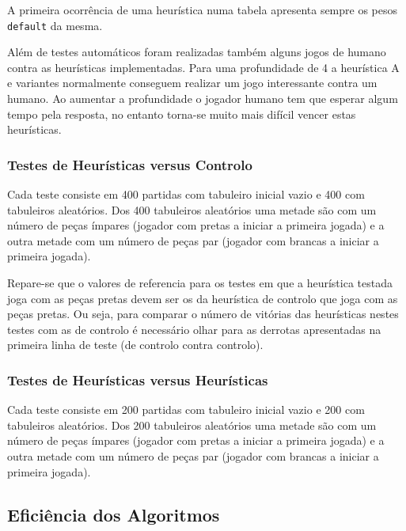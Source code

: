 A primeira ocorrência de uma heurística numa tabela apresenta sempre os pesos \verb|default| da mesma.

Além de testes automáticos foram realizadas também alguns jogos de humano contra as heurísticas implementadas. Para uma profundidade de 4 a heurística A e variantes normalmente conseguem realizar um jogo interessante contra um humano. Ao aumentar a profundidade o jogador humano tem que esperar algum tempo pela resposta, no entanto torna-se muito mais difícil vencer estas heurísticas. 

\subsubsection{Testes de Heurísticas versus Controlo}

Cada teste consiste em 400 partidas com tabuleiro inicial vazio e 400 com tabuleiros aleatórios. Dos 400 tabuleiros aleatórios uma metade são com um número de peças ímpares (jogador com pretas a iniciar a primeira jogada) e a outra metade com um número de peças par (jogador com brancas a iniciar a primeira jogada). 

Repare-se que o valores de referencia para os testes em que a heurística testada joga com as peças pretas devem ser os da heurística de controlo que joga com as peças pretas. Ou seja, para comparar o número de vitórias das heurísticas nestes testes com as de controlo é necessário olhar para as derrotas apresentadas na primeira linha de teste (de controlo contra controlo).




\newpage
\subsubsection{Testes de Heurísticas versus Heurísticas}

Cada teste consiste em 200 partidas com tabuleiro inicial vazio e 200 com tabuleiros aleatórios. Dos 200 tabuleiros aleatórios uma metade são com um número de peças ímpares (jogador com pretas a iniciar a primeira jogada) e a outra metade com um número de peças par (jogador com brancas a iniciar a primeira jogada).




\subsection{Eficiência dos Algoritmos}

